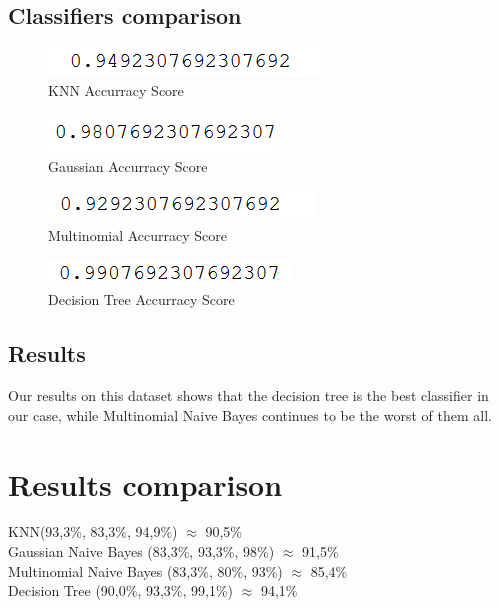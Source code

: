 \documentclass{article}
\begin{document}
\subsection{Classifiers comparison}

\begin{figure}[!h]
  \caption{KNN Accurracy Score}
  \centering
      \includegraphics[scale=0.7]{knnWine.png}
\end{figure}


\begin{figure}[!h]
  \centering
  \caption{Gaussian Accurracy Score}
    \includegraphics[scale=0.7]{GaussianWine.png}
\end{figure}


\begin{figure}[!h]
  \caption{Multinomial Accurracy Score}
  \centering
    \includegraphics[scale=0.7]{multiWine.png}
\end{figure}

\begin{figure}[!h]
  \caption{Decision Tree Accurracy Score}
  \centering
    \includegraphics[scale=0.7]{treeWine.png}
\end{figure}
\FloatBarrier

\subsection{Results}
Our results on this dataset shows that the decision tree is the best classifier in our case, while Multinomial Naive Bayes continues to be the worst of them all.

\section{Results comparison}
KNN(93,3\%, 83,3\%, 94,9\%)   \hfill            $\approx$ 90,5\%  \\
Gaussian Naive Bayes (83,3\%, 93,3\%, 98\%) \hfill     $\approx$ 91,5\%  \\
Multinomial Naive Bayes (83,3\%, 80\%, 93\%) \hfill     $\approx$ 85,4\% \\
Decision Tree (90,0\%, 93,3\%, 99,1\%) \hfill         $\approx$ 94,1\% \\
\end{document}
